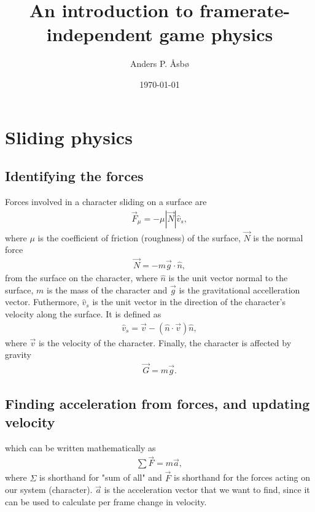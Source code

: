 \documentclass[%
notitlepage,
 amsmath,amssymb,
 aps,
]{revtex4-2}  %
\begin{document}
\title{An introduction to framerate-independent game physics}   %
\author{Anders P. Åsbø}               %
\date{\today}                             %
\noaffiliation                            %

\maketitle                                %
\tableofcontents
\newpage

\section{Sliding physics}
\subsection{Identifying the forces}
Forces involved in a character sliding on a surface are
\begin{align*}
	\vec{F}_{\mu} = -\mu |\vec{N}| \hat{v}_{s},
\end{align*}
where \(\mu\) is the coefficient of friction (roughness) of the surface, \(\vec{N}\) is the normal force
\begin{align*}
	\vec{N} = - m\vec{g}\cdot \hat{n},
\end{align*}
from the surface on the  character, where \(\hat{n}\) is the unit vector normal to the surface, \(m\) is the mass of the character and \(\vec{g}\) is the gravitational accelleration vector. Futhermore, \(\hat{v}_{s}\) is the unit vector in the direction of the character's velocity along the surface. It is defined as
\begin{align*}
	\hat{v}_{s} = \vec{v} - \left(\hat{n} \cdot \vec{v}\right)\hat{n},
\end{align*}
where \(\vec{v}\) is the velocity of the character.
Finally, the character is affected by gravity
\begin{align*}
	\vec{G} = m\vec{g}.
\end{align*}

\subsection{Finding acceleration from forces, and updating velocity}
which can be written mathematically as
\begin{align*}
	\sum \vec{F} = m\vec{a},
\end{align*}
where \(\Sigma\) is shorthand for "sum of all" and \(\vec{F}\) is shorthand for the forces acting on our system (character). \(\vec{a}\) is the acceleration vector that we want to find, since it can be used to calculate per frame change in velocity.
 
\end{document}
